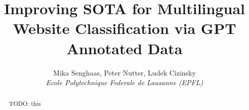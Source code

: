 \documentclass[10pt,conference,compsocconf]{IEEEtran}
\begin{document}
\title{Improving SOTA for Multilingual Website Classification via GPT Annotated Data}

\author{
  Mika Senghaas, Peter Nutter, Ludek Cizinsky\\
  \textit{Ecole Polytechnique Federale de Lausanne (EPFL)}\\
}

\maketitle

\begin{abstract}
  TODO: this
\end{abstract}





\newpage


\end{document}
